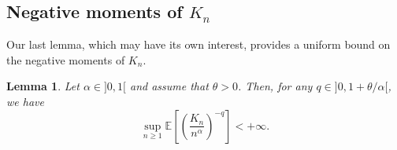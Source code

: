\documentclass[twoside,12pt]{article}
\newcommand{\E}{\mathds{E}}
\newtheorem{lem}[thm]{Lemma}
\begin{document}
\subsection{Negative moments of $K_{n}$}

Our last lemma, which may have its own interest, provides a uniform bound on the negative moments of $K_{n}$.

\begin{lem}\label{lem:unif-neg-moment}
Let $\alpha\in]0,1[$ and assume that $\theta>0$. Then, for any $q\in]0,1\!+\!\theta/\alpha[$, we have
\begin{equation}
\label{NEGMKN}
\sup_{n\ge1}\E\left[\left(\frac{K_n}{n^\alpha}\right)^{-q}\right]<+\infty .
\end{equation}
\end{lem}
\end{document}
